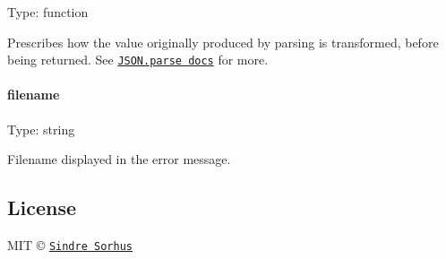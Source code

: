 Type\+: {\ttfamily function}

Prescribes how the value originally produced by parsing is transformed, before being returned. See \href{https://developer.mozilla.org/en-US/docs/Web/JavaScript/Reference/Global_Objects/JSON/parse#Using_the_reviver_parameter}{\tt {\ttfamily J\+S\+O\+N.\+parse} docs} for more.

\paragraph*{filename}

Type\+: {\ttfamily string}

Filename displayed in the error message.

\subsection*{License}

M\+IT © \href{http://sindresorhus.com}{\tt Sindre Sorhus} 